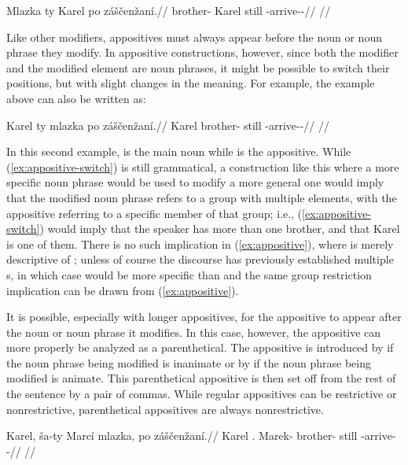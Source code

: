 \pex\label{ex:appositive}
\begingl
  \gla Mlazka ty Karel po záščenžaní.//
  \glb brother-\Dim{} \Lnk{} Karel still \Neg{}-arrive-\Av{}-\Ret{}//
  \glft {}//
\endgl
\xe

Like other modifiers, appositives must always appear before the noun or noun
phrase they modify. In appositive constructions, however, since both the
modifier and the modified element are noun phrases, it might be possible to
switch their positions, but with slight changes in the meaning. For example, the
example above can also be written as:

\pex\label{ex:appositive-switch}
\begingl
  \gla {}Karel ty mlazka po záščenžaní.//
  \glb Karel \Lnk{} brother-\Dim{} still \Neg{}-arrive-\Av{}-\Ret{}//
  \glft {}//
\endgl
\xe

In this second example,  is the main noun while  is the
appositive. While (\ref{ex:appositive-switch}) is still grammatical, a
construction like this where a more specific noun phrase would be used to modify
a more general one would imply that the modified noun phrase refers to a group
with multiple elements, with the appositive referring to a specific member of
that group; i.e., (\ref{ex:appositive-switch}) would imply that the speaker has
more than one brother, and that Karel is one of them. There is no such
implication in (\ref{ex:appositive}), where  is merely descriptive
of ; unless of course the discourse has previously established
multiple s, in which case  would be more specific than
 and the same group restriction implication can be drawn from
(\ref{ex:appositive}).

It is possible, especially with longer appositives, for the appositive to appear
after the noun or noun phrase it modifies. In this case, however, the appositive
can more properly be analyzed as a parenthetical. The appositive is introduced
by  if the noun phrase being modified is inanimate or by 
if the noun phrase being modified is animate. This parenthetical appositive is
then set off from the rest of the sentence by a pair of commas. While regular
appositives can be restrictive or nonrestrictive, parenthetical appositives are
always nonrestrictive.

\pex
\begingl
  \gla Karel, ša-ty Marcí mlazka, po záščenžaní.//
  \glb Karel \Anim{}.\Lnk{} Marek-\Gen{} brother-\Dim{} still \Neg{}-arrive-\Av{}-\Ret{}//
  \glft {}//
\endgl
\xe

